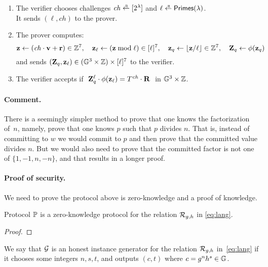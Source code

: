 \documentclass[11pt]{article}
\begin{document}
\begin{itemize}
\begin{enumerate}
\item The verifier chooses challenges $\mathit{ch} \rgets \range{2^\lambda}$
and $\ell \rgets \primes$. \\
It sends $(\ell, \mathit{ch})$ to the prover.

\item The prover computes:
\[  \mathbf{z} \gets (\mathit{ch} \cdot \mathbf{v} + \mathbf{r}) \in \mathbb Z^7, \quad
    \mathbf{z}_\ell \gets (\mathbf{z} \bmod \ell) \in [{\ell}]^7, \quad
    \mathbf{z}_q \gets \lfloor \mathbf{z} / \ell \rfloor \in \mathbb Z^7, \quad
    \mathbf{Z}_q \gets \phi(\mathbf{z}_q)  
\]
and sends $(\mathbf{Z}_q, \mathbf{z}_\ell) \in (\mathbb G^3 \times \mathbb Z) \times [{\ell}]^7$ 
to the verifier. 

\item The verifier accepts if 
$\ \mathbf{Z}_q^\ell \cdot \phi(\mathbf{z}_\ell) = T^\mathit{ch} \cdot \mathbf{R}\ $ in 
$\mathbb G^3 \times \mathbb Z$.
\end{enumerate}
\end{itemize}

\paragraph{Comment.}
There is a seemingly simpler method to prove that one knows the
factorization of~$n$, namely, prove that one knows $p$ such that $p$
divides $n$.  That is, instead of committing to $w$ we would commit to
$p$ and then prove that the committed value divides $n$. But we would
also need to prove that the committed factor is not one of 
$\{1, -1, n, -n\}$, and that results in a longer proof.

\paragraph{Proof of security.}
We need to prove the protocol above is zero-knowledge and a 
proof of knowledge. 

\begin{theorem}
Protocol $\mathbb{{P}}$ is a zero-knowledge protocol
for the relation ${\cal R}_{g,h}$ in \eqref{eq:lang}.
\end{theorem}

\begin{proof}

\end{proof}


We say that ${\cal G}$ is an honest instance
generator for the relation ${\cal R}_{g,h}$ in~\eqref{eq:lang}
if it chooses some integers $n, s, t$, and outputs $(c, t)$ where
$c = g^n h^s \in \mathbb G$. 
\end{document}
